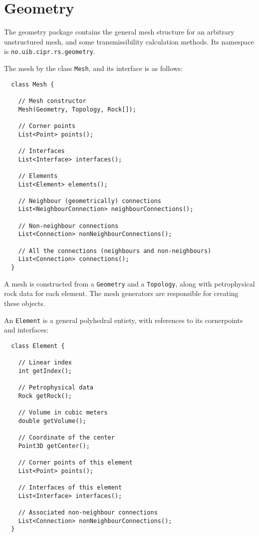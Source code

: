 \chapter{Geometry}
\label{chap:geometry}

\minitoc

The geometry package contains the general mesh structure for an
arbitrary unstructured mesh, and some transmissibility calculation
methods. Its namespace is \texttt{no.uib.cipr.rs.geometry}.



The mesh by the class \texttt{Mesh}, and its interface is as follows:

\begin{lstlisting}
  class Mesh {

    // Mesh constructor
    Mesh(Geometry, Topology, Rock[]);

    // Corner points
    List<Point> points();

    // Interfaces
    List<Interface> interfaces();

    // Elements
    List<Element> elements();

    // Neighbour (geometrically) connections
    List<NeighbourConnection> neighbourConnections();

    // Non-neighbour connections
    List<Connection> nonNeighbourConnections();

    // All the connections (neighbours and non-neighbours)
    List<Connection> connections();
  }
\end{lstlisting}

A mesh is constructed from a \texttt{Geometry} and a
\texttt{Topology}, along with petrophysical rock data for each
element. The mesh generators are responsible for creating these
objects.



An \texttt{Element} is a general polyhedral entiety, with references
to its cornerpoints and interfaces:
\begin{lstlisting}
  class Element {

    // Linear index
    int getIndex();

    // Petrophysical data
    Rock getRock();

    // Volume in cubic meters
    double getVolume();

    // Coordinate of the center
    Point3D getCenter();

    // Corner points of this element
    List<Point> points();

    // Interfaces of this element
    List<Interface> interfaces();

    // Associated non-neighbour connections
    List<Connection> nonNeighbourConnections();
  }
\end{lstlisting}

